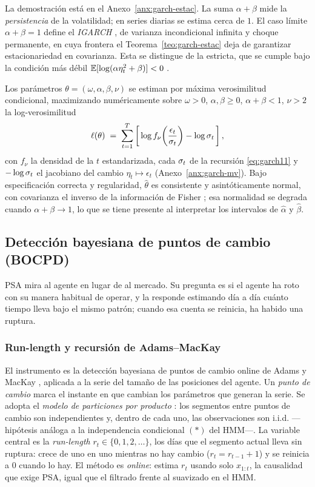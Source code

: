 La demostración está en el Anexo~\ref{anx:garch-estac}. La suma $\alpha + \beta$ mide la \emph{persistencia} de la volatilidad; en series diarias se estima cerca de $1$. El caso límite $\alpha + \beta = 1$ define el \emph{IGARCH} \cite{englebollerslev1986}, de varianza incondicional infinita y choque permanente, en cuya frontera el Teorema~\ref{teo:garch-estac} deja de garantizar estacionariedad en covarianza. Esta se distingue de la estricta, que se cumple bajo la condición más débil $\mathbb{E}[\log(\alpha \eta_t^2+\beta)]<0$ \cite{nelson1990}.

Los parámetros $\theta = (\omega, \alpha, \beta, \nu)$ se estiman por máxima verosimilitud condicional, maximizando numéricamente sobre $\omega>0$, $\alpha,\beta\ge 0$, $\alpha+\beta<1$, $\nu>2$ la log-verosimilitud
\[
\ell(\theta) \;=\; \sum_{t=1}^{T} \left[\, \log f_\nu\!\left(\frac{\epsilon_t}{\sigma_t}\right) - \log \sigma_t \,\right],
\]
con $f_\nu$ la densidad de la $t$ estandarizada, cada $\sigma_t$ de la recursión \eqref{eq:garch11} y $-\log\sigma_t$ el jacobiano del cambio $\eta_t \mapsto \epsilon_t$ (Anexo~\ref{anx:garch-mv}). Bajo especificación correcta y regularidad, $\hat\theta$ es consistente y asintóticamente normal, con covarianza el inverso de la información de Fisher \cite{francqzakoian2019}; esa normalidad se degrada cuando $\alpha+\beta\to 1$, lo que se tiene presente al interpretar los intervalos de $\hat\alpha$ y $\hat\beta$.

\subsection{Detección bayesiana de puntos de cambio (BOCPD)}
\label{sec:bocpd}

PSA mira al agente en lugar de al mercado. Su pregunta es si el agente ha roto con su manera habitual de operar, y la responde estimando día a día cuánto tiempo lleva bajo el mismo patrón; cuando esa cuenta se reinicia, ha habido una ruptura.

\subsubsection{Run-length y recursión de Adams--MacKay}
\label{sec:bocpd-runlength}
\label{sec:bocpd-recursion}

El instrumento es la detección bayesiana de puntos de cambio online de Adams y MacKay \cite{adams2007}, aplicada a la serie del tamaño de las posiciones del agente. Un \emph{punto de cambio} marca el instante en que cambian los parámetros que generan la serie. Se adopta el \emph{modelo de particiones por producto} \cite{adams2007}: los segmentos entre puntos de cambio son independientes y, dentro de cada uno, las observaciones son i.i.d. —hipótesis análoga a la independencia condicional $(\ast)$ del HMM—. La variable central es la \emph{run-length} $r_t \in \{0,1,2,\dots\}$, los días que el segmento actual lleva sin ruptura: crece de uno en uno mientras no hay cambio ($r_t = r_{t-1}+1$) y se reinicia a $0$ cuando lo hay. El método es \emph{online}: estima $r_t$ usando solo $x_{1:t}$, la causalidad que exige PSA, igual que el filtrado frente al suavizado en el HMM.

